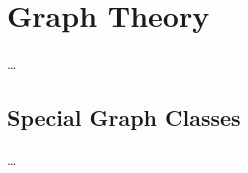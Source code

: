 
\geometry{vmargin=0pt}
\def\whereweleftoff{%
    \setcounter{chapter}{0}
    \chapter{Graph Theory}
    \ldots\par
    \setcounter{section}{3}
    \section{Special Graph Classes}
    \ldots\par
}


\whereweleftoff




